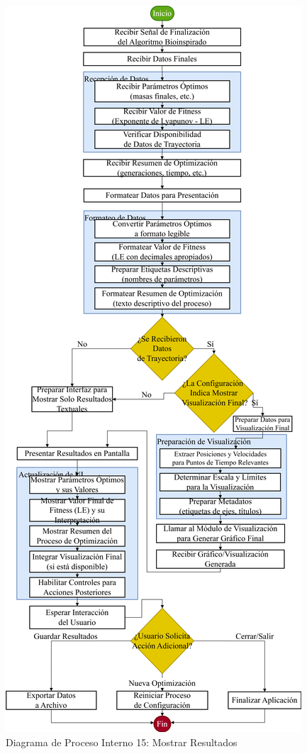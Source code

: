 \begin{figure}[H]
    \centering
    \includegraphics[width=\textwidth]{img/Analisis/DiagramaProcesos/DiagramaProceso15_Proceso Interno_Mostrar Resultados.png}
    \caption{Diagrama de Proceso Interno 15: Mostrar Resultados}%
    \label{fig:process_diagram15}
\end{figure}